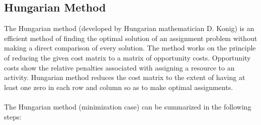 \subsection{Hungarian Method}
The Hungarian method (developed by Hungarian mathematician D. Konig) is
an efficient method of finding the optimal solution of an assignment problem without making a direct comparison of every solution. The method works on the principle of reducing the given cost matrix to a matrix of opportunity costs. Opportunity costs show the relative penalties associated with assigning a resource to an activity. Hungarian method reduces the cost matrix to the extent of having at least one zero in each row and column so as to make optimal assignments.\\\\
The Hungarian method (minimization case) can be summarized in the following steps:
